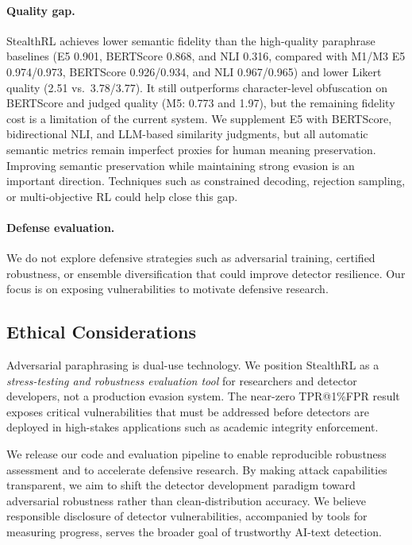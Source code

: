 \documentclass[11pt]{article}
\begin{document}
\paragraph{Quality gap.} StealthRL achieves lower semantic fidelity than the high-quality paraphrase baselines (E5 0.901, BERTScore 0.868, and NLI 0.316, compared with M1/M3 E5 0.974/0.973, BERTScore 0.926/0.934, and NLI 0.967/0.965) and lower Likert quality (2.51 vs.\ 3.78/3.77). It still outperforms character-level obfuscation on BERTScore and judged quality (M5: 0.773 and 1.97), but the remaining fidelity cost is a limitation of the current system. We supplement E5 with BERTScore, bidirectional NLI, and LLM-based similarity judgments, but all automatic semantic metrics remain imperfect proxies for human meaning preservation. Improving semantic preservation while maintaining strong evasion is an important direction. Techniques such as constrained decoding, rejection sampling, or multi-objective RL could help close this gap.

\paragraph{Defense evaluation.} We do not explore defensive strategies such as adversarial training, certified robustness, or ensemble diversification that could improve detector resilience. Our focus is on exposing vulnerabilities to motivate defensive research.

\subsection{Ethical Considerations}

Adversarial paraphrasing is dual-use technology. We position StealthRL as a \emph{stress-testing and robustness evaluation tool} for researchers and detector developers, not a production evasion system. The near-zero TPR@1\%FPR result exposes critical vulnerabilities that must be addressed before detectors are deployed in high-stakes applications such as academic integrity enforcement.

We release our code and evaluation pipeline to enable reproducible robustness assessment and to accelerate defensive research. By making attack capabilities transparent, we aim to shift the detector development paradigm toward adversarial robustness rather than clean-distribution accuracy. We believe responsible disclosure of detector vulnerabilities, accompanied by tools for measuring progress, serves the broader goal of trustworthy AI-text detection.
\end{document}
